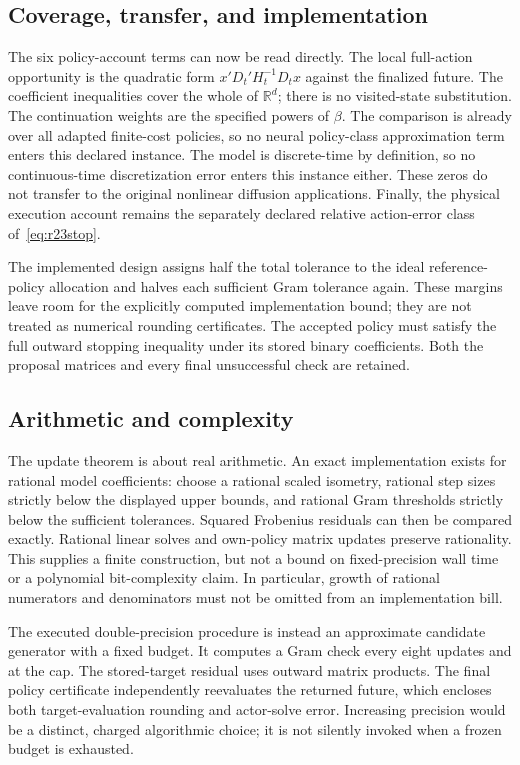 \subsection{Coverage, transfer, and implementation}
The six policy-account terms can now be read directly. The local full-action
opportunity is the quadratic form $x'D_t'H_t^{-1}D_tx$ against the finalized
future. The coefficient inequalities cover the whole of $\mathbb R^d$;
there is no visited-state substitution. The continuation weights are the
specified powers of $\beta$. The comparison is already over all adapted
finite-cost policies, so no neural policy-class approximation term enters
this declared instance. The model is discrete-time by definition, so no
continuous-time discretization error enters this instance either. These
zeros do not transfer to the original nonlinear diffusion applications.
Finally, the physical execution account remains the separately declared
relative action-error class of~\eqref{eq:r23stop}.

The implemented design assigns half the total tolerance to the ideal
reference-policy allocation and halves each sufficient Gram tolerance again.
These margins leave room for the explicitly computed implementation bound;
they are not treated as numerical rounding certificates. The accepted policy
must satisfy the full outward stopping inequality under its stored binary
coefficients. Both the proposal matrices and every final unsuccessful check
are retained.

\subsection{Arithmetic and complexity}
The update theorem is about real arithmetic. An exact implementation exists
for rational model coefficients: choose a rational scaled isometry, rational
step sizes strictly below the displayed upper bounds, and rational Gram
thresholds strictly below the sufficient tolerances. Squared Frobenius
residuals can then be compared exactly. Rational linear solves and own-policy
matrix updates preserve rationality. This supplies a finite construction,
but not a bound on fixed-precision wall time or a polynomial bit-complexity
claim. In particular, growth of rational numerators and denominators must
not be omitted from an implementation bill.

The executed double-precision procedure is instead an approximate candidate
generator with a fixed budget. It computes a Gram check every eight updates
and at the cap. The stored-target residual uses outward matrix products.
The final policy certificate independently reevaluates the returned future,
which encloses both target-evaluation rounding and actor-solve error.
Increasing precision would be a distinct, charged algorithmic choice; it is
not silently invoked when a frozen budget is exhausted.

